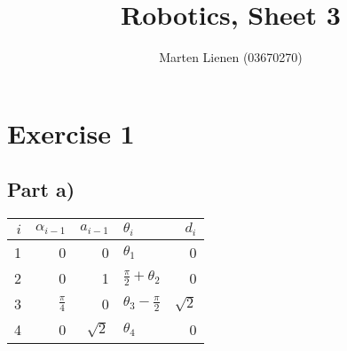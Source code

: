 \documentclass[10pt,a4paper]{article}
\title{Robotics, Sheet 3}
\author{Marten Lienen (03670270)}
\begin{document}
\maketitle

\section*{Exercise 1}

\subsection*{Part a)}

\begin{tabular}{rrrlr}
$i$ & $\alpha_{i - 1}$ & $a_{i - 1}$ & $\theta_{i}$ & $d_{i}$\\
\hline
1 & 0 & 0 & $\theta_{1}$ & 0\\
2 & 0 & 1 & $\frac{\pi{}}{2} + \theta_{2}$ & 0\\
3 & $\frac{\pi}{4}$ & 0 & $\theta_{3} - \frac{\pi}{2}$ & $\sqrt{2}$\\
4 & 0 & $\sqrt{2}$ & $\theta_{4}$ & 0\\
\end{tabular}
\begin{comment}
#+ORGTBL: SEND dh-parameters-1 orgtbl-to-latex :splice nil :skip 0 :raw t
| $i$ | $\alpha_{i - 1}$ | $a_{i - 1}$ | $\theta_{i}$                   |    $d_{i}$ |
|-----+------------------+-------------+--------------------------------+------------|
|   1 |                0 |           0 | $\theta_{1}$                   |          0 |
|   2 |                0 |           1 | $\frac{\pi{}}{2} + \theta_{2}$ |          0 |
|   3 |  $\frac{\pi}{4}$ |           0 | $\theta_{3} - \frac{\pi}{2}$   | $\sqrt{2}$ |
|   4 |                0 |  $\sqrt{2}$ | $\theta_{4}$                   |          0 |
\end{comment}
\end{document}
